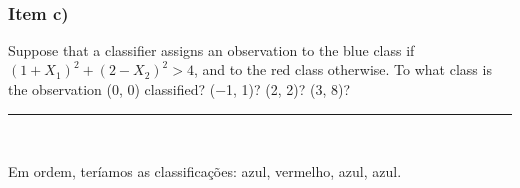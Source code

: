 \documentclass[
  a4paperpaper,
]{article}
\begin{document}
\begin{figure}[H]


\caption{\label{fig-q2b}}

\end{figure}%

~

\subsubsection{Item c)}\label{item-c}

Suppose that a classifier assigns an observation to the blue class if
\((1 + X_1)^2 + (2 − X_2)^2 > 4\), and to the red class otherwise. To
what class is the observation (0, 0) classified? (−1, 1)? (2, 2)? (3,
8)?

\begin{center}\rule{0.5\linewidth}{0.5pt}\end{center}

~

Em ordem, teríamos as classificações: azul, vermelho, azul, azul.
\end{document}
